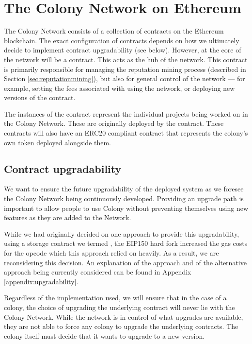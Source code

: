 \section{The Colony Network on Ethereum}\label{sec:colonynetwork}

The Colony Network consists of a collection of contracts on the Ethereum blockchain. The exact configuration of contracts depends on how we ultimately decide to implement contract upgradability (see below). However, at the core of the network will be a  contract. This acts as the hub of the network. This contract is primarily responsible for managing the reputation mining process (described in Section \ref{sec:reputationmining}), but also for general control of the network --- for example, setting the fees associated with using the network, or deploying new versions of the  contract.

The instances of the  contract represent the individual projects being worked on in the Colony Network. These are originally deployed by the  contract. These  contracts will also have an ERC20 compliant contract that represents the colony's own token deployed alongside them.

\subsection{Contract upgradability}

We want to ensure the future upgradability of the deployed system as we foresee the Colony Network being continuously developed. Providing an upgrade path is important to allow people to use Colony without preventing themselves using new features as they are added to the Network.

While we had originally decided on one approach to provide this upgradability, using a storage contract we termed , the EIP150 hard fork increased the gas costs for the  opcode which this approach relied on heavily. As a result, we are reconsidering this decision. An explanation of the  approach and of the alternative approach being currently considered can be found in Appendix \ref{appendix:upgradability}.

Regardless of the implementation used, we will ensure that in the case of a colony, the choice of upgrading the underlying  contract will never lie with the Colony Network. While the network is in control of what upgrades are available, they are not able to force any colony to upgrade the underlying contracts. The colony itself must decide that it wants to upgrade to a new version.

